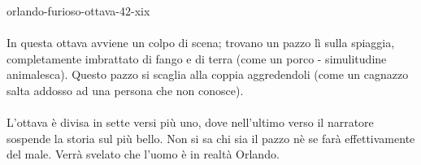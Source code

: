 \documentclass[preview]{standalone}
\begin{document}
\begin{snippet}{orlando-furioso-ottava-42-xix}
    \\\\
    In questa ottava avviene un colpo di scena; trovano un pazzo lì sulla spiaggia,
    completamente imbrattato di fango e di terra (come un porco - simulitudine animalesca).
    Questo pazzo si scaglia alla coppia aggredendoli
    (come un cagnazzo salta addosso ad una persona che non conosce).
    \\\\
    L'ottava è divisa in sette versi più uno, dove nell'ultimo verso
    il narratore sospende la storia sul più bello.
    Non si sa chi sia il pazzo nè se farà effettivamente del male.
    Verrà svelato che l'uomo è in realtà Orlando.
\end{snippet}
\end{document}
